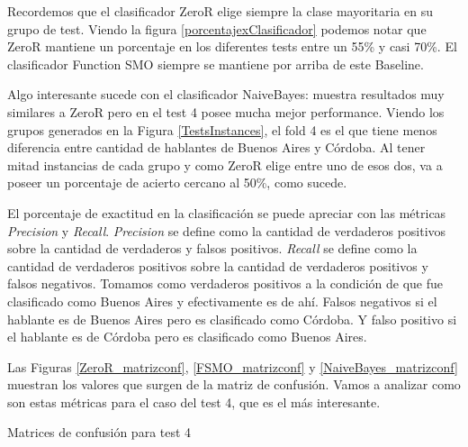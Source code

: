 Recordemos que el clasificador ZeroR elige siempre la clase mayoritaria en su grupo de test. Viendo la figura \ref{porcentajexClasificador} podemos notar que ZeroR mantiene un porcentaje en los diferentes tests entre un 55\% y casi 70\%. El clasificador Function SMO siempre se mantiene por arriba de este Baseline.

Algo interesante sucede con el clasificador NaiveBayes: muestra resultados muy similares a ZeroR pero en el test 4 posee mucha mejor performance. Viendo los grupos generados en la Figura \ref{TestsInstances}, el fold 4 es el que tiene menos diferencia entre cantidad de hablantes de Buenos Aires y Córdoba. Al tener mitad instancias de cada grupo y como ZeroR elige entre uno de esos dos, va a poseer un porcentaje de acierto cercano al 50\%, como sucede.  

El porcentaje de exactitud en la clasificación se puede apreciar con las métricas \textit{Precision} y \textit{Recall}. \textit{Precision} se define como la cantidad de verdaderos positivos sobre la cantidad de verdaderos y falsos positivos. \textit{Recall} se define como la cantidad de verdaderos positivos sobre la cantidad de verdaderos positivos y falsos negativos. Tomamos como verdaderos positivos a la condición de que fue clasificado como Buenos Aires y efectivamente es de ahí. Falsos negativos si el hablante es de Buenos Aires pero es clasificado como Córdoba. Y falso positivo si el hablante es de Córdoba pero es clasificado como Buenos Aires. 


Las Figuras \ref{ZeroR_matrizconf}, \ref{FSMO_matrizconf} y \ref{NaiveBayes_matrizconf} muestran los valores que  surgen de la matriz de confusión. Vamos a analizar como son estas métricas para el caso del test 4, que es el más interesante.


\begin{center}
\Large Matrices de confusión para test 4
\end{center}

